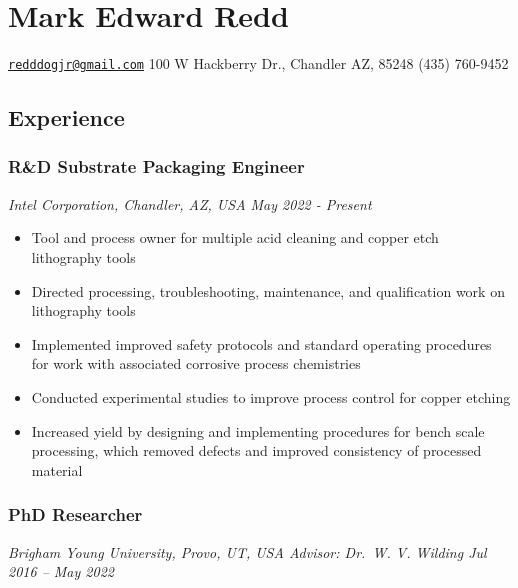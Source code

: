 
\section{Mark Edward Redd}\label{mark-edward-redd}

\href{mailto:redddogjr@gmail.com}{\nolinkurl{redddogjr@gmail.com}}
\textbar{} 100 W Hackberry Dr., Chandler AZ, 85248 \textbar{} (435)
760-9452


\subsection{Experience}\label{experience}

\subsubsection{R\&D Substrate Packaging
Engineer}\label{rd-substrate-packaging-engineer}

\emph{Intel Corporation, Chandler, AZ, USA \textbar{} May 2022 -
Present}

\begin{itemize}
\tightlist
\item
  Tool and process owner for multiple acid cleaning and copper etch
  lithography tools
\item
  Directed processing, troubleshooting, maintenance, and qualification
  work on lithography tools
\item
  Implemented improved safety protocols and standard operating
  procedures for work with associated corrosive process chemistries
\item
  Conducted experimental studies to improve process control for copper
  etching
\item
  Increased yield by designing and implementing procedures for bench
  scale processing, which removed defects and improved consistency of
  processed material
\end{itemize}

\subsubsection{PhD Researcher}\label{phd-researcher}

\emph{Brigham Young University, Provo, UT, USA \textbar{} Advisor:
Dr.~W. V. Wilding \textbar{} Jul 2016 -- May 2022}

